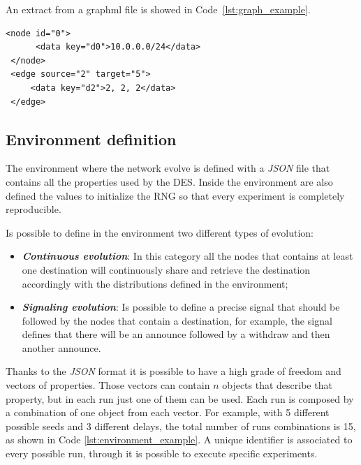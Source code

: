 An extract from a graphml file is showed in Code~\ref{lst:graph_example}.
\begin{lstlisting}[language=graphml, caption=Graph example, label=lst:graph_example]
 <node id="0">
      <data key="d0">10.0.0.0/24</data>
 </node>
 <edge source="2" target="5">
     <data key="d2">2, 2, 2</data>
 </edge>
\end{lstlisting}

\subsection{Environment definition}
\label{subsec:exp_environments_definition}

The environment where the network evolve is defined with a \textit{JSON}
file that contains all the properties used by the \ac{DES}.
Inside the environment are also defined the values to initialize the \ac{RNG}
so that every experiment is completely reproducible.

Is possible to define in the environment two different types of evolution:
\begin{itemize}
    \item \textbf{\textit{Continuous evolution}}: In this category all the nodes
    that contains at least one destination will continuously share and retrieve
    the destination accordingly with the distributions defined in the environment;
    \item \textbf{\textit{Signaling evolution}}: Is possible to define a precise
    signal that should be followed by the nodes that contain a destination, for
    example, the signal  defines that there will be an announce followed by
    a withdraw and then another announce.
\end{itemize}

Thanks to the \textit{JSON} format it is possible to have a high grade of
freedom and vectors of properties.
Those vectors can contain $n$ objects that describe that property, but in each
run just one of them can be used.
Each run is composed by a combination of one object from each vector.
For example, with \num{5} different possible seeds and \num{3} different
delays, the total number of runs combinations is \num{15}, as shown in Code
\ref{lst:environment_example}.
A unique identifier is associated to every possible run, through it is possible
to execute specific experiments.

